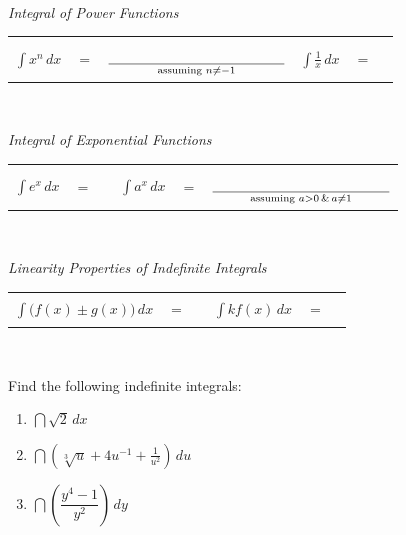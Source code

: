\documentclass[10pt]{article}
\begin{document}
\

\begin{center}
{\it Integral of Power Functions}\\[0.1in]
\begin{tabular}{ r c l r c l}
$\displaystyle\int x^n\, dx$ & ${=}$ & $\underset{\text{assuming }n\not=-1}{\rule[-8pt]{1.75in}{0.4pt}}$ & $\displaystyle\int\frac1x\,dx$ & $=$ & \rule[-8pt]{1.75in}{0.4pt}\\[0.1in]
\end{tabular}
\end{center}

\

\begin{center}
{\it Integral of Exponential Functions}\\[0.1in]
\begin{tabular}{ r c l r c l}
$\displaystyle\int e^x\, dx$ & $=$ & \rule[-8pt]{1.75in}{0.4pt} & $\displaystyle\int a^x\,dx$ & $=$ & $\underset{\text{assuming }a>0\,\&\,a\not=1}{\rule[-8pt]{1.75in}{0.4pt}}$\\[0.1in]
\end{tabular}
\end{center}

\

\begin{center}
{\it Linearity Properties of Indefinite Integrals}\\[0.1in]
\begin{tabular}{ r c l r c l}
$\displaystyle\int \big( f(x) \pm g(x) \big)\, dx$ & $=$ & \rule[-8pt]{1.75in}{0.4pt} & $\displaystyle\int kf(x) \,dx$ & $=$ & \rule[-8pt]{1.75in}{0.4pt}\\[0.1in]
\end{tabular}
\end{center}

\

{\exercise} Find the following indefinite integrals:

\begin{enumerate}

\item[(a)] $\dint \sqrt2 \,dx$

\vfill

\item[(b)] $\dint \left(\sqrt[3]{u}+4u^{-1}+\frac{1}{u^2}\right)\,du$

\vfill

\item[(c)] $\dint \left(\dfrac{y^4-1}{y^2} \right)\,dy$ 

\vfill
\vfill

\end{enumerate}
\end{document}
